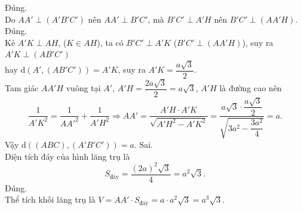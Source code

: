 \begin{ex}
{\begin{center}
        \end{center}
        \begin{itemchoice}
            \itemch	 Đúng.\\
            Do $AA'\perp (A'B'C')$ nên $AA'\perp B'C'$, mà $B'C'\perp A'H$ nên $B'C'\perp (AA'H)$.
            \itemch	 Đúng.\\
            Kẻ $A'K\perp AH$, ($K\in AH$), ta có $B'C'\perp A'K$ ($B'C'\perp (AA'H) $), suy ra $A'K\perp (AB'C')$\\ hay $\mathrm{d}(A',(AB'C'))=A'K$, suy ra $A'K=\dfrac{a\sqrt{3}}{2}$.\\
            Tam giác $AA'H$ vuông tại $A'$, $A'H=\dfrac{2a\sqrt{3}}{2}=a\sqrt{3}$, $A'H$ là đường cao nên
            \[\dfrac{1}{A'K^2}=\dfrac{1}{AA'^2}+\dfrac{1}{A'H^2}\Rightarrow AA'=\dfrac{A'H\cdot A'K}{\sqrt{A'H^2-A'K^2}}=\dfrac{a\sqrt{3}\cdot \dfrac{a\sqrt{3}}{2}}{\sqrt{3a^2-\dfrac{3a^2}{4}}}=a.\]
            Vậy $\mathrm{d}\left( \left(ABC \right) ,\left(A'B'C' \right) \right)=a$.
            \itemch	Sai.\\
            Diện tích đáy của hình lăng trụ là
            \[S_{\text{đáy}}=\dfrac{(2a)^2\sqrt{3}}{4}=a^2\sqrt{3}.\]
            \itemch Đúng.\\
            Thể tích khối lăng trụ là $V=AA'\cdot S_{\text{đáy}}=a\cdot a^2\sqrt{3}=a^3\sqrt{3}$.
        \end{itemchoice}
        
    }
\end{ex}

